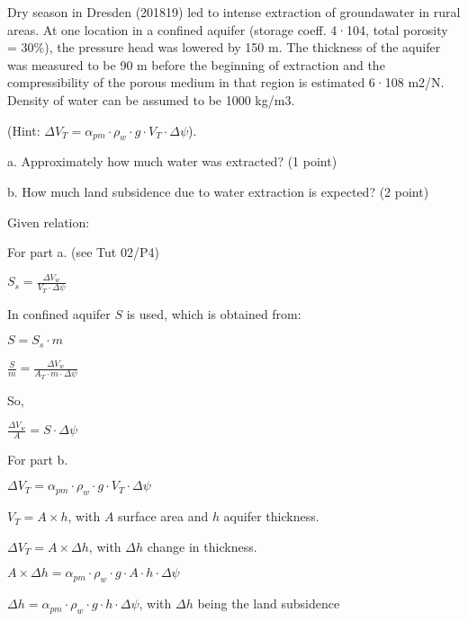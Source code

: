 \documentclass[letterpaper,10pt,english]{sphinxmanual}
\begin{document}

Dry season in Dresden (2018\sphinxhyphen{}19) led to intense extraction of groundawater in rural areas. At one location in a confined aquifer (storage coeff. 4·10\sphinxhyphen{}4, total porosity = 30\%),  the pressure head was lowered by 150 m. The thickness of the aquifer was measured to be 90 m before the beginning of extraction and the compressibility of the porous medium in that region is estimated 6·10\sphinxhyphen{}8 m2/N. Density of water can be assumed to be 1000 kg/m3.

(Hint: \(\Delta V_T = \alpha_{pm}\cdot\rho_w \cdot g \cdot  V_T \cdot  \Delta \psi \)).

a. Approximately how much water was extracted? (1 point)

b. How much land subsidence due to water extraction is expected? (2 point)


Given relation:

For part a. (see Tut 02/P4)

\(
S_s  = \frac{\Delta V_w}{V_T\cdot \Delta \psi}
\)

In confined aquifer \(S\) is used, which is obtained from:

\(S = S_s \cdot m\)

\(
 \frac{S}{m} = \frac{\Delta V_w}{A_T\cdot m \cdot \Delta \psi}
\)

So,

\(  \frac{\Delta V_w}{A}  = S \cdot \Delta \psi\)

For part b.

\(\Delta V_T = \alpha_{pm}\cdot\rho_w \cdot g \cdot  V_T \cdot  \Delta \psi \)

\(V_T = A\times h\), with \(A\) surface area and \(h\) aquifer thickness.

\(\Delta V_T = A \times \Delta h\), with \(\Delta h\) change in thickness.

\(A \times \Delta h= \alpha_{pm}\cdot\rho_w \cdot g \cdot  A \cdot h \cdot  \Delta \psi \)

\(\Delta h = \alpha_{pm}\cdot\rho_w \cdot g \cdot h \cdot  \Delta \psi\), with \(\Delta h\) being the land subsidence
\end{document}
